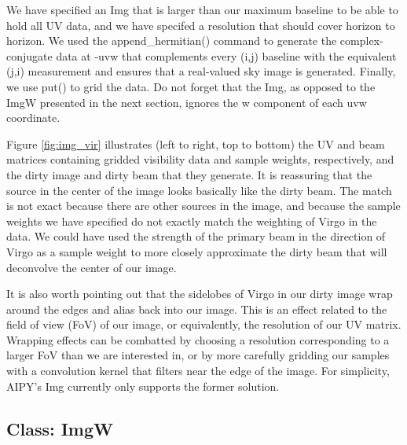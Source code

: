 We have specified an Img that is larger than our maximum baseline to be able
to hold all UV data, and we have specifed a resolution that should cover
horizon to horizon.  We used the append\_hermitian() command to generate
the complex-conjugate data at -uvw that complements every (i,j) baseline
with the equivalent (j,i) measurement and ensures that a real-valued sky
image is generated.  Finally, we use put() to grid the data.  Do not
forget that the Img, as opposed to the ImgW presented in the next section,
ignores the w component of each uvw coordinate.

Figure \ref{fig:img_vir} illustrates (left to right, top to bottom) the
UV and beam matrices containing gridded visibility data and sample weights,
respectively, and the dirty image and dirty beam that they generate.
It is reassuring that the source in the center of the image looks basically
like the dirty beam.  The match is not exact because there are other sources
in the image, and because the sample weights we have specified do not exactly
match the weighting of Virgo in the data.  We could have used
the strength of the primary beam in the direction of Virgo as a sample
weight to more closely approximate the dirty beam that will deconvolve
the center of our image.

It is also worth pointing out that the sidelobes of Virgo in our dirty image
wrap around the edges and alias back into our image.  This is an effect
related to the field of view (FoV) of our image, or equivalently, the
resolution of our UV matrix.  Wrapping effects can be combatted by choosing a
resolution corresponding to a larger FoV than we are interested in, or by more
carefully gridding our samples with a convolution kernel that filters near the
edge of the image.  For simplicity, AIPY's Img currently only supports the
former solution.

\subsection{Class: ImgW}

